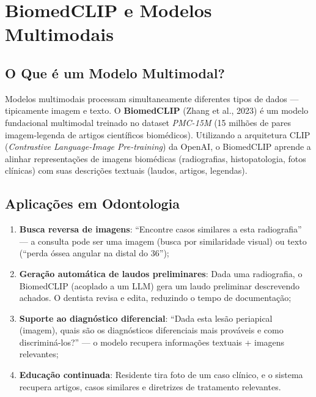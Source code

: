 \section{BiomedCLIP e Modelos Multimodais}

\subsection{O Que é um Modelo Multimodal?}

Modelos multimodais processam simultaneamente diferentes tipos de dados --- tipicamente imagem e texto. O \textbf{BiomedCLIP} (Zhang et al., 2023) é um modelo fundacional multimodal treinado no dataset \textit{PMC-15M} (15 milhões de pares imagem-legenda de artigos científicos biomédicos). Utilizando a arquitetura CLIP (\textit{Contrastive Language-Image Pre-training}) da OpenAI, o BiomedCLIP aprende a alinhar representações de imagens biomédicas (radiografias, histopatologia, fotos clínicas) com suas descrições textuais (laudos, artigos, legendas).

\subsection{Aplicações em Odontologia}

\begin{enumerate}
    \item \textbf{Busca reversa de imagens}: ``Encontre casos similares a esta radiografia'' --- a consulta pode ser uma imagem (busca por similaridade visual) ou texto (``perda óssea angular na distal do 36'');

    \item \textbf{Geração automática de laudos preliminares}: Dada uma radiografia, o BiomedCLIP (acoplado a um LLM) gera um laudo preliminar descrevendo achados. O dentista revisa e edita, reduzindo o tempo de documentação;

    \item \textbf{Suporte ao diagnóstico diferencial}: ``Dada esta lesão periapical (imagem), quais são os diagnósticos diferenciais mais prováveis e como discriminá-los?'' --- o modelo recupera informações textuais + imagens relevantes;

    \item \textbf{Educação continuada}: Residente tira foto de um caso clínico, e o sistema recupera artigos, casos similares e diretrizes de tratamento relevantes.
\end{enumerate}

